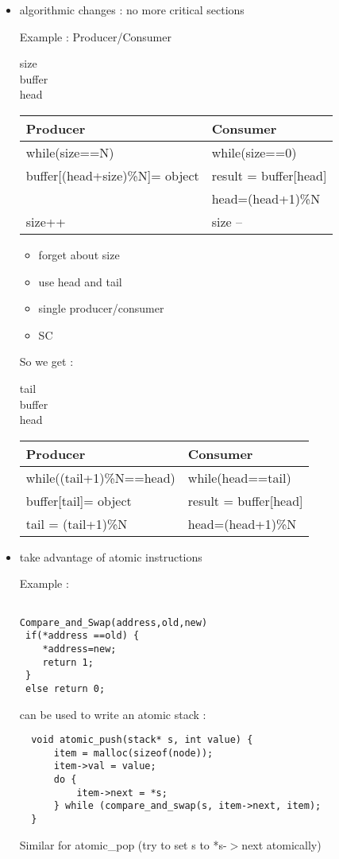 \documentclass[a4paper,10pt]{article}
\begin{document}
\begin{itemize}
  \item algorithmic changes : no more critical sections
  
  Example : Producer/Consumer
  
  \begin{center}
size\\buffer\\head

      \begin{tabular}{l|l}
        Producer & Consumer\\
		\hline
        while(size==N) {} & while(size==0) {}\\
        buffer[(head+size)\%N]= object & result = buffer[head]\\
         & head=(head+1)\%N \\        
        size++ & size -- \\
      \end{tabular}
    \end{center}
  
  
  \begin{itemize}
    \item forget about size
    \item use head and tail
    \item single producer/consumer
    \item SC
  \end{itemize}

So we get :
\begin{center}
tail\\buffer\\head

      \begin{tabular}{l|l}
        Producer & Consumer\\
		\hline
        while((tail+1)\%N==head) {} & while(head==tail) {}\\
        buffer[tail]= object & result = buffer[head]\\
        tail = (tail+1)\%N & head=(head+1)\%N \\        
      \end{tabular}
    \end{center}    

\item take advantage of atomic instructions

Example : 
\begin{verbatim}

Compare_and_Swap(address,old,new)
 if(*address ==old) {
    *address=new;
    return 1;
 }
 else return 0;
\end{verbatim}
can be used to write an atomic stack :

\begin{verbatim}
  void atomic_push(stack* s, int value) {
      item = malloc(sizeof(node));
      item->val = value;
      do {
          item->next = *s;
      } while (compare_and_swap(s, item->next, item);
  }
\end{verbatim}

Similar for atomic\_pop (try to set s to *s-$>$next atomically)

\end{itemize}
\end{document}
